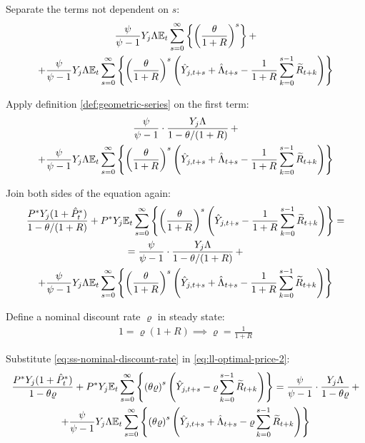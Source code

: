 \documentclass[
thesis.tex
]{subfiles}
\begin{document}
	Separate the terms not dependent on $s$:
	\begin{multline}
		\frac{\psi}{\psi-1} Y_{j} \Lambda {\mathbb{E}_{t}} \sum_{s=0}^{\infty} \left\{ \left( \frac{\theta}{1 + R} \right)^s \right\} + 
		\\
		+ \frac{\psi}{\psi-1} Y_{j} \Lambda {\mathbb{E}_{t}} \sum_{s=0}^{\infty} \left\{ \left( \frac{\theta}{1 + R} \right)^s \left( \hat{Y}_{j,t+s} + \hat{\Lambda}_{t+s} - \frac{1}{1 + R} \sum_{k=0}^{s-1} \widetilde{R}_{t+k} \right) \right\} \nonumber
	\end{multline}
	
	Apply definition \ref{def:geometric-series} on the first term:
	\begin{multline}
		\frac{\psi}{\psi-1} \cdot \frac{Y_{j} \Lambda}{1-\theta /(1+R)} \, + 
		\\
		+ \frac{\psi}{\psi-1} Y_{j} \Lambda {\mathbb{E}_{t}} \sum_{s=0}^{\infty} \left\{ \left( \frac{\theta}{1 + R} \right)^s \left( \hat{Y}_{j,t+s} + \hat{\Lambda}_{t+s} - \frac{1}{1 + R} \sum_{k=0}^{s-1} \widetilde{R}_{t+k} \right) \right\} \nonumber
	\end{multline}
	
	Join both sides of the equation again:
	\begin{multline}
		\frac{ P^\ast Y_{j} ( 1 + \hat{P}_t^\ast ) }{1-\theta /(1+R)} + P^\ast Y_{j} {\mathbb{E}_{t}} \sum_{s=0}^{\infty} \left\{ \left( \frac{\theta}{1 + R} \right)^s \left( \hat{Y}_{j,t+s} - \frac{1}{1 + R} \sum_{k=0}^{s-1} \widetilde{R}_{t+k} \right) \right\} = 
		\\
		= \frac{\psi}{\psi-1} \cdot \frac{Y_{j} \Lambda}{1-\theta /(1+R)} \, + 
		\\
		+ \frac{\psi}{\psi-1} Y_{j} \Lambda {\mathbb{E}_{t}} \sum_{s=0}^{\infty} \left\{ \left( \frac{\theta}{1 + R} \right)^s \left( \hat{Y}_{j,t+s} + \hat{\Lambda}_{t+s} - \frac{1}{1 + R} \sum_{k=0}^{s-1} \widetilde{R}_{t+k} \right) \right\} \label{eq:ll-optimal-price-2}
	\end{multline}
	
	Define a nominal discount rate $\varrho$ in steady state:
	\begin{align}
		1 = \varrho (1 + R) \implies \varrho = \frac{1}{1 + R} \label{eq:ss-nominal-discount-rate}
	\end{align}
	
	Substitute \ref{eq:ss-nominal-discount-rate} in \ref{eq:ll-optimal-price-2}:
	\begin{multline}
		\frac{ P^\ast Y_{j} ( 1 + \hat{P}_t^\ast ) }{1- \theta \varrho} + P^\ast Y_{j} {\mathbb{E}_{t}} \sum_{s=0}^{\infty} \left\{ \left( \theta \varrho \right)^s \left( \hat{Y}_{j,t+s} - \varrho \sum_{k=0}^{s-1} \widetilde{R}_{t+k} \right) \right\} = \frac{\psi}{\psi-1} \cdot \frac{Y_{j} \Lambda}{1- \theta \varrho } \, + 
		\\ 
		+ \frac{\psi}{\psi-1} Y_{j} \Lambda {\mathbb{E}_{t}} \sum_{s=0}^{\infty} \left\{ \left( \theta \varrho \right)^s \left( \hat{Y}_{j,t+s} + \hat{\Lambda}_{t+s} - \varrho \sum_{k=0}^{s-1} \widetilde{R}_{t+k} \right) \right\} \label{eq:ll-optimal-price-3}
	\end{multline}
	
\end{document}
